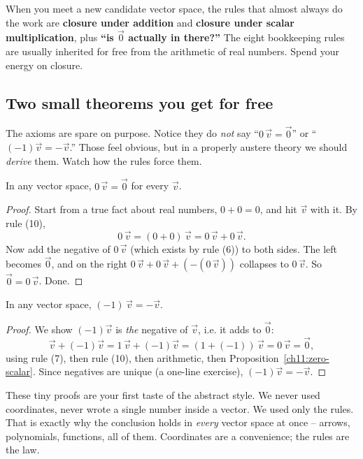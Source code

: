 \begin{focusbox}
When you meet a new candidate vector space, the rules that almost always do the work are
\textbf{closure under addition} and \textbf{closure under scalar multiplication}, plus
\textbf{``is $\vec{0}$ actually in there?''} The eight bookkeeping rules are usually
inherited for free from the arithmetic of real numbers. Spend your energy on closure.
\end{focusbox}

\subsection{Two small theorems you get for free}

The axioms are spare on purpose. Notice they do \emph{not} say ``$0\,\vec{v} = \vec{0}$''
or ``$(-1)\vec{v} = -\vec{v}$.'' Those feel obvious, but in a properly austere theory we
should \emph{derive} them. Watch how the rules force them.

\begin{proposition}\label{ch11:zero-scalar}
In any vector space, $0\,\vec{v} = \vec{0}$ for every $\vec{v}$.
\end{proposition}

\begin{proof}
Start from a true fact about real numbers, $0 + 0 = 0$, and hit $\vec{v}$ with it. By
rule (10),
\[
0\,\vec{v} = (0+0)\,\vec{v} = 0\,\vec{v} + 0\,\vec{v}.
\]
Now add the negative of $0\,\vec{v}$ (which exists by rule (6)) to both sides. The left
becomes $\vec{0}$, and on the right $0\,\vec{v} + 0\,\vec{v} + (-(0\,\vec{v}))$ collapses
to $0\,\vec{v}$. So $\vec{0} = 0\,\vec{v}$. Done.
\end{proof}

\begin{proposition}\label{ch11:neg-one}
In any vector space, $(-1)\,\vec{v} = -\vec{v}$.
\end{proposition}

\begin{proof}
We show $(-1)\vec{v}$ is \emph{the} negative of $\vec{v}$, i.e. it adds to $\vec{0}$:
\[
\vec{v} + (-1)\vec{v} = 1\,\vec{v} + (-1)\vec{v} = (1 + (-1))\,\vec{v} = 0\,\vec{v} = \vec{0},
\]
using rule (7), then rule (10), then arithmetic, then
Proposition~\ref{ch11:zero-scalar}. Since negatives are unique (a one-line exercise),
$(-1)\vec{v} = -\vec{v}$.
\end{proof}

\begin{intuitionbox}
These tiny proofs are your first taste of the abstract style. We never used coordinates,
never wrote a single number inside a vector. We used only the rules. That is exactly why
the conclusion holds in \emph{every} vector space at once -- arrows, polynomials,
functions, all of them. Coordinates are a convenience; the rules are the law.
\end{intuitionbox}

